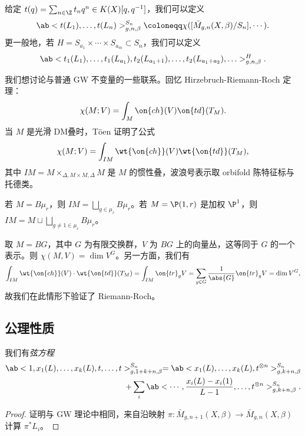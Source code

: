 给定 \(t(q) = \sum_{n \in \Z} t_n q^n \in K(X)[q,q^{-1}]\)，我们可以定义
\[ \ab< t(L_1), \ldots, t(L_n)>^{S_n}_{g,n,\beta} \coloneqq \chi ([\bar{M}_{g,n}(X,\beta)/S_n], \cdots). \]
更一般地，若 \(H = S_{a_1} \times \cdots \times S_{a_m} \subset S_n\)，我们可以定义
\[ \ab<t_1(L_1), \ldots, t_1(L_{a_1}), t_2(L_{a_1+1}), \ldots, t_2(L_{a_1+a_2}), \ldots>_{g,n,\beta}^H. \]

\begin{rmk}
    我们想讨论与普通 GW 不变量的一些联系。回忆 Hirzebruch-Riemann-Roch 定理：
    \[ \chi(M; V) = \int_M \on{ch}(V) \on{td}(T_M). \]
    当 \(M\) 是光滑 DM叠时，T\"oen 证明了公式
    \[ \chi(M; V) = \int_{IM} \wt{\on{ch}}(V) \wt{\on{td}}(T_M), \]
    其中 \(IM = M \times_{\Delta, M \times M, \Delta} M\) 是 \(M\) 的惯性叠，波浪号表示取 orbifold 陈特征标与托德类。
\end{rmk}

\begin{exm}
    若 \(M = B\mu_r\)，则 \(IM = \bigsqcup_{g \in \mu_r} B \mu_r\)。若 \(M = \P(1, r)\) 是加权 \(\P^1\)，则 \(IM = M \sqcup \bigsqcup_{g \neq 1 \in \mu_r} B\mu_r\)。
\end{exm}

\begin{exm}
    取 \(M = BG\)，其中 \(G\) 为有限交换群，\(V\) 为 \(BG\) 上的向量丛，这等同于 \(G\) 的一个表示。则 \(\chi(M, V) = \dim V^G\)。另一方面，我们有
    \[ \int_{IM} \wt{\on{ch}}(V) \cdot \wt{\on{td}}(T_M) = \int_{IM} \on{tr}_g V = \sum_{g \in G} \frac{1}{\abs{G}} \on{tr}_g V = \dim V^G, \]
    故我们在此情形下验证了 Riemann-Roch。
\end{exm}

\subsection{公理性质}%
\label{sub:Axiomatic properties}

\begin{lem}
    我们有\textit{弦方程}
    \begin{align*}
        \ab< 1, x_1(L), \ldots, x_k(L), t, \ldots, t >_{g, 1+k+n, \beta}^{S_n} = \ab<x_1(L), \ldots, x_k(L), t^{\otimes n}>^{S_n}_{g,k+n,\beta} \\
        + \sum_i \ab< \cdots, \frac{x_i(L) - x_i(1)}{L-1}, \ldots, t^{\otimes n}>^{S_n}_{g,k+n,\beta}. 
    \end{align*}
\end{lem}

\begin{proof}
    证明与 GW 理论中相同，来自沿映射 \(\pi \colon\bar{M}_{g,n+1}(X,\beta) \to \bar{M}_{g,n}(X,\beta)\) 计算 \(\pi^* L_i\)。
\end{proof}

